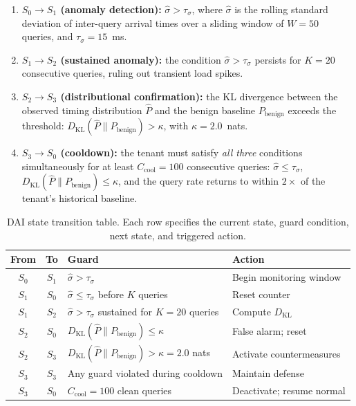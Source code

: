 \begin{enumerate}[leftmargin=1.5em,itemsep=2pt]
    \item \textbf{$S_0 \to S_1$ (anomaly detection):} $\hat{\sigma} > \tau_\sigma$, where
          $\hat{\sigma}$ is the rolling standard deviation of inter-query arrival times
          over a sliding window of $W = 50$ queries, and $\tau_\sigma = 15$~ms.
    \item \textbf{$S_1 \to S_2$ (sustained anomaly):} the condition $\hat{\sigma} > \tau_\sigma$
          persists for $K = 20$ consecutive queries, ruling out transient load spikes.
    \item \textbf{$S_2 \to S_3$ (distributional confirmation):} the KL divergence between
          the observed timing distribution $\hat{P}$ and the benign baseline $P_{\mathrm{benign}}$
          exceeds the threshold:
          $D_{\mathrm{KL}}(\hat{P} \| P_{\mathrm{benign}}) > \kappa$, with $\kappa = 2.0$~nats.
    \item \textbf{$S_3 \to S_0$ (cooldown):} the tenant must satisfy \emph{all three}
          conditions simultaneously for at least $C_{\mathrm{cool}} = 100$ consecutive
          queries: $\hat{\sigma} \leq \tau_\sigma$, $D_{\mathrm{KL}}(\hat{P} \| P_{\mathrm{benign}}) \leq \kappa$,
          and the query rate returns to within $2\times$ of the tenant's historical baseline.
\end{enumerate}

\begin{table}[t]
\centering
\caption{DAI state transition table. Each row specifies the current state, guard condition,
next state, and triggered action.}
\label{tab:dfa-transitions}
\small
\begin{tabular}{@{}ccll@{}}
\toprule
\textbf{From} & \textbf{To} & \textbf{Guard} & \textbf{Action} \\
\midrule
$S_0$ & $S_1$ & $\hat{\sigma} > \tau_\sigma$ & Begin monitoring window \\
$S_1$ & $S_0$ & $\hat{\sigma} \leq \tau_\sigma$ before $K$ queries & Reset counter \\
$S_1$ & $S_2$ & $\hat{\sigma} > \tau_\sigma$ sustained for $K = 20$ queries & Compute $D_{\mathrm{KL}}$ \\
$S_2$ & $S_0$ & $D_{\mathrm{KL}}(\hat{P} \| P_{\mathrm{benign}}) \leq \kappa$ & False alarm; reset \\
$S_2$ & $S_3$ & $D_{\mathrm{KL}}(\hat{P} \| P_{\mathrm{benign}}) > \kappa = 2.0$ nats & Activate countermeasures \\
$S_3$ & $S_3$ & Any guard violated during cooldown & Maintain defense \\
$S_3$ & $S_0$ & $C_{\mathrm{cool}} = 100$ clean queries & Deactivate; resume normal \\
\bottomrule
\end{tabular}
\end{table}

